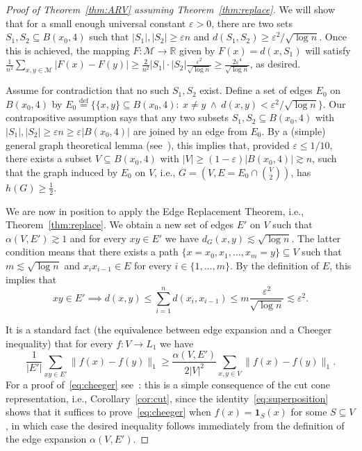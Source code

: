 \documentclass{icm2010}
\theoremstyle{definition}
\newcommand{\R}{\mathbb{R}}
\newcommand{\eqdef}{\stackrel{\mathrm{def}}{=}}
\newcommand{\1}{\mathbf{1}}
\newcommand{\M}{\mathscr{M}}
\renewcommand{\le}{\leqslant}
\renewcommand{\ge}{\geqslant}
\newcommand{\e}{\varepsilon}
\begin{document}
\begin{proof}[Proof of Theorem~\ref{thm:ARV} assuming Theorem~\ref{thm:replace}]
We will show that for a small enough universal constant $\e>0$,
there are two sets $S_1,S_2\subseteq B(x_0,4)$ such that
$|S_1|,|S_2|\ge\e n$ and $d(S_1,S_2)\ge \e^2/\sqrt{\log n}$. Once
this is achieved, the mapping $F:\M\to \R$ given by $F(x)=d(x,S_1)$
will satisfy $\frac{1}{n^2}\sum_{x,y\in \M} |F(x)-F(y)|\ge
\frac{2}{n^2}|S_1|\cdot |S_2|\frac{\e^2}{\sqrt{\log n}}\ge
\frac{2\e^4}{\sqrt{\log n}}$, as desired.

Assume for contradiction that no such $S_1,S_2$ exist. Define a set
of edges $E_0$ on $B(x_0,4)$ by $E_0\eqdef \Big\{\{x,y\}\subseteq
B(x_0,4):\ x\neq y\ \wedge \ d(x,y)<\e^2/\sqrt{\log n}\Big\}$. Our
contrapositive assumption says that any two subsets
$S_1,S_2\subseteq B(x_0,4)$ with $|S_1|,|S_2|\ge \e n\ge
\e|B(x_0,4)|$ are joined by an edge from $E_0$. By a (simple)
general graph theoretical lemma (see~\cite[Lem\ 2.3]{NRS05}), this
implies that, provided $\e\le 1/10$, there exists a subset
$V\subseteq B(x_0,4)$ with $|V|\ge (1-\e)|B(x_0,4)|\gtrsim n$, such
that the graph induced by $E_0$ on $V$, i.e., $G=\left(V,E=E_0\cap
{V\choose 2}\right)$, has  $h(G)\ge \frac12$.

We are now in position to apply the Edge Replacement Theorem, i.e., Theorem~\ref{thm:replace}. We obtain a new set of edges $E'$ on $V$ such that $\alpha(V,E')\gtrsim 1$ and for every $xy\in E'$ we have $d_G(x,y)\lesssim \sqrt{\log n}$. The latter condition means that there exists a path $\{x=x_0,x_1,\ldots,x_m=y\}\subseteq V$ such that $m\lesssim \sqrt{\log n}$ and $x_{i}x_{i-1}\in E$ for every $i\in \{1,\ldots,m\}$. By the definition of $E$, this implies that
\begin{equation}\label{eq:chain}
xy\in E'\implies d(x,y)\le \sum_{i=1}^nd(x_i,x_{i-1})\le m\frac{\e^2}{\sqrt{\log n}}\lesssim \e^2.
\end{equation}

It is a standard fact (the equivalence between edge expansion and a Cheeger inequality) that for every $f:V\to L_1$ we have
\begin{equation}\label{eq:cheeger}
\frac{1}{|E'|}\sum_{xy\in E'} \|f(x)-f(y)\|_1\ge \frac{\alpha(V,E')}{2|V|^2}\sum_{x,y\in V}\|f(x)-f(y)\|_1.
\end{equation}
For a proof of~\eqref{eq:cheeger} see~\cite[Fact\ 2.1]{NRS05}: this is a simple consequence of the cut cone representation, i.e., Corollary~\ref{cor:cut}, since the identity~\eqref{eq:superposition} shows that it suffices to prove~\eqref{eq:cheeger} when $f(x)=\1_S(x)$ for some $S\subseteq V$, in which case the desired inequality follows immediately from the definition of the edge expansion $\alpha(V,E')$.


\end{proof}
\end{document}
